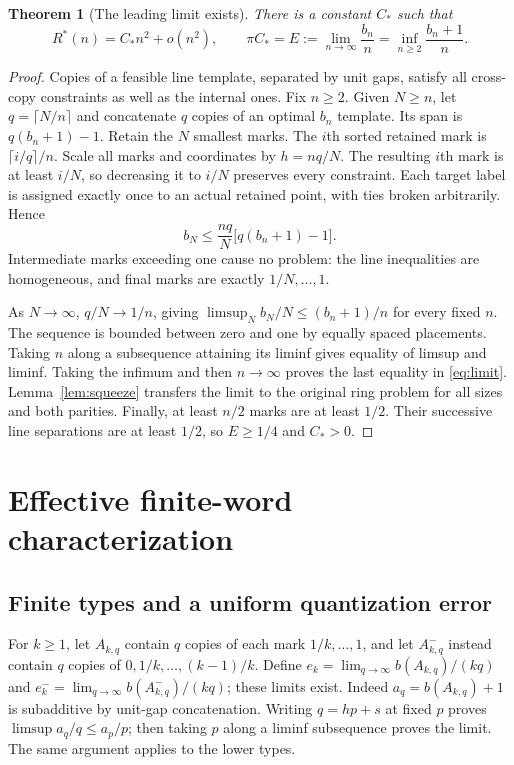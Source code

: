 \documentclass[11pt]{article}
\newtheorem{theorem}{Theorem}
\theoremstyle{definition}\newtheorem{definition}[theorem]{Definition}
\theoremstyle{remark}\newtheorem{remark}[theorem]{Remark}
\newcommand{\Rstar}{R^\ast}
\newcommand{\CC}{C_\ast}
\begin{document}
\begin{theorem}[The leading limit exists]\label{thm:existence}
There is a constant $\CC$ such that
\begin{equation}\label{eq:limit}
 \Rstar(n)=\CC n^2+o(n^2),\qquad
 \pi\CC=E:=\lim_{n\to\infty}\frac{b_n}{n}
 =\inf_{n\ge2}\frac{b_n+1}{n}.
\end{equation}
\end{theorem}
\begin{proof}
Copies of a feasible line template, separated by unit gaps, satisfy all
cross-copy constraints as well as the internal ones. Fix $n\ge2$. Given
$N\ge n$, let $q=\lceil N/n\rceil$ and concatenate $q$ copies of an
optimal $b_n$ template. Its span is $q(b_n+1)-1$.
Retain the $N$ smallest marks. The $i$th sorted retained mark is
$\lceil i/q\rceil/n$. Scale all marks and coordinates by $h=nq/N$.
The resulting $i$th mark is at least $i/N$, so decreasing it to $i/N$
preserves every constraint. Each target label is assigned exactly once
to an actual retained point, with ties broken arbitrarily. Hence
\begin{equation}\label{eq:copies}
 b_N\le\frac{nq}{N}\bigl[q(b_n+1)-1\bigr].
\end{equation}
Intermediate marks exceeding one cause no problem: the line inequalities
are homogeneous, and final marks are exactly $1/N,\ldots,1$.

As $N\to\infty$, $q/N\to1/n$, giving
$\limsup_N b_N/N\le(b_n+1)/n$ for every fixed $n$.
The sequence is bounded between zero and one by equally spaced placements.
Taking $n$ along a subsequence attaining its liminf gives equality of
limsup and liminf. Taking the infimum and then $n\to\infty$ proves
the last equality in \eqref{eq:limit}. Lemma~\ref{lem:squeeze} transfers
the limit to the original ring problem for all sizes and both parities.
Finally, at least $n/2$ marks are at least $1/2$. Their successive line
separations are at least $1/2$, so $E\ge1/4$ and $\CC>0$.
\end{proof}

\section{Effective finite-word characterization}\label{sec:lp}

\subsection{Finite types and a uniform quantization error}
For $k\ge1$, let $A_{k,q}$ contain $q$ copies of each mark
$1/k,\ldots,1$, and let $A^-_{k,q}$ instead contain $q$ copies of
$0,1/k,\ldots,(k-1)/k$. Define
$e_k=\lim_{q\to\infty}b(A_{k,q})/(kq)$ and
$e^-_k=\lim_{q\to\infty}b(A^-_{k,q})/(kq)$; these limits exist.
Indeed $a_q=b(A_{k,q})+1$ is subadditive by unit-gap concatenation.
Writing $q=hp+s$ at fixed $p$ proves
$\limsup a_q/q\le a_p/p$; then taking $p$ along a liminf subsequence
proves the limit. The same argument applies to the lower types.
\end{document}
